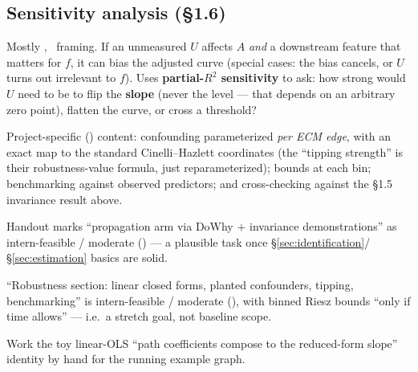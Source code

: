 \subsection{Sensitivity analysis (\S1.6)}

Mostly , \newtag~framing. If an unmeasured $U$
affects $A$ \emph{and} a downstream feature that matters for $f$, it can
bias the adjusted curve (special cases: the bias cancels, or $U$ turns out
irrelevant to $f$). Uses \textbf{partial-$R^2$ sensitivity} to ask: how
strong would $U$ need to be to flip the \textbf{slope} (never the level ---
that depends on an arbitrary zero point), flatten the curve, or cross a
threshold?

Project-specific (\newtag) content: confounding parameterized \emph{per ECM
edge}, with an exact map to the standard Cinelli--Hazlett coordinates (the
``tipping strength'' is their robustness-value formula, just
reparameterized); bounds at each bin; benchmarking against observed
predictors; and cross-checking against the \S1.5 invariance result above.

\begin{openquestions}
  \item Handout marks ``propagation arm via DoWhy $+$ invariance
    demonstrations'' as intern-feasible / moderate (\feasmod) --- a
    plausible task once \S\ref{sec:identification}/\S\ref{sec:estimation}
    basics are solid.
  \item ``Robustness section: linear closed forms, planted confounders,
    tipping, benchmarking'' is intern-feasible / moderate (\feasmod), with
    binned Riesz bounds ``only if time allows'' --- i.e.\ a stretch goal,
    not baseline scope.
  \item Work the toy linear-OLS ``path coefficients compose to the
    reduced-form slope'' identity by hand for the running example graph.
\end{openquestions}
